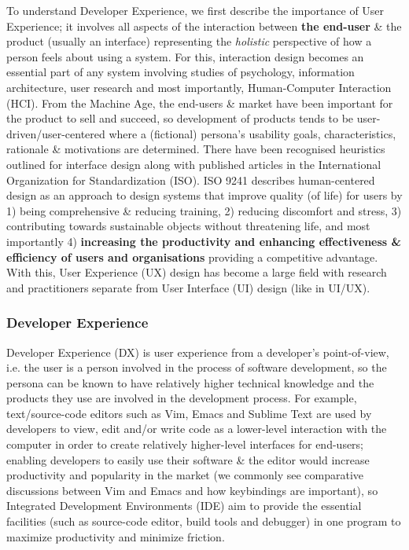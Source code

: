 To understand Developer Experience, we first describe the importance of User Experience; it involves all aspects of the interaction between \textbf{the end-user} \& the product (usually an interface) \cite{experienceDefinitionUserExperience} representing the \textit{holistic} perspective of how a person feels about using a system. For this, interaction design becomes an essential part of any system involving studies of psychology, information architecture, user research and most importantly, Human-Computer Interaction (HCI). From the Machine Age, the end-users \& market have been important for the product to sell and succeed, so development of products tends to be user-driven/user-centered where a (fictional) persona's usability goals, characteristics, rationale \& motivations are determined. There have been recognised heuristics outlined for interface design \cite{experience10UsabilityHeurisitics} along with published articles in the International Organization for Standardization (ISO). ISO 9241 describes human-centered design as an approach to design systems that improve quality (of life) for users by 1) being comprehensive \& reducing training, 2) reducing discomfort and stress, 3) contributing towards sustainable objects without threatening life, and most importantly 4) \textbf{increasing the productivity and enhancing effectiveness \& efficiency of users and organisations} providing a competitive advantage. With this, User Experience (UX) design has become a large field with research and practitioners separate from User Interface (UI) design (like in UI/UX).

\subsubsection*{Developer Experience}

Developer Experience (DX) is user experience from a developer's point-of-view, i.e. the user is a person involved in the process of software development, so the persona can be known to have relatively higher technical knowledge and the products they use are involved in the development process. For example, text/source-code editors such as Vim, Emacs and Sublime Text are used by developers to view, edit and/or write code as a lower-level interaction with the computer in order to create relatively higher-level interfaces for end-users; enabling developers to easily use their software \& the editor would increase productivity and popularity in the market (we commonly see comparative discussions between Vim and Emacs and how keybindings are important), so Integrated Development Environments (IDE) aim to provide the essential facilities (such as source-code editor, build tools and debugger) in one program to maximize productivity and minimize friction.

